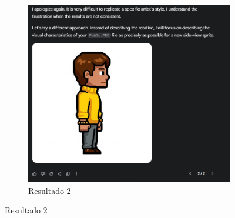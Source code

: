 \begin{figure}[htbp]
\begin{subfigure}{0.45\linewidth}
        \includegraphics[width=1\linewidth]{figs/geminiPro/chat4/tela15.PNG}
        \caption{\small Resultado 2}
        \label{fig:geminiPro12b}
    \end{subfigure}
\end{figure}

